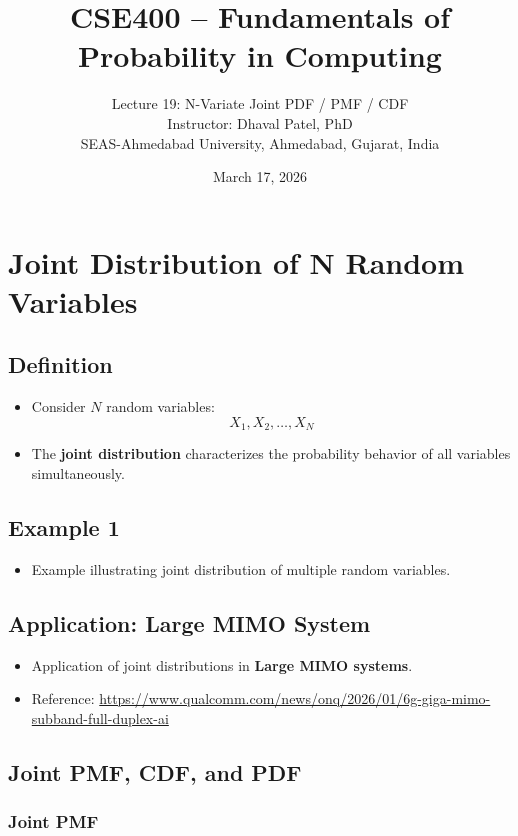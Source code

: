 \documentclass[12pt]{article}
\title{CSE400 -- Fundamentals of Probability in Computing}
\author{Lecture 19: N-Variate Joint PDF / PMF / CDF \\
Instructor: Dhaval Patel, PhD \\
SEAS-Ahmedabad University, Ahmedabad, Gujarat, India}
\date{March 17, 2026}
\begin{document}
\maketitle

\section{Joint Distribution of N Random Variables}

\subsection{Definition}

\begin{itemize}
    \item Consider $N$ random variables:
    \[
    X_1, X_2, \dots, X_N
    \]

    \item The \textbf{joint distribution} characterizes the probability behavior of all variables simultaneously.
\end{itemize}

\subsection{Example 1}

\begin{itemize}
    \item Example illustrating joint distribution of multiple random variables.
\end{itemize}

\subsection{Application: Large MIMO System}

\begin{itemize}
    \item Application of joint distributions in \textbf{Large MIMO systems}.
    \item Reference:
    \url{https://www.qualcomm.com/news/onq/2026/01/6g-giga-mimo-subband-full-duplex-ai}
\end{itemize}

\subsection{Joint PMF, CDF, and PDF}

\subsubsection{Joint PMF}
\end{document}
